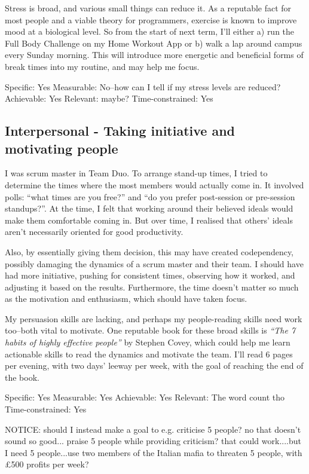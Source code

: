 \documentclass{scrartcl}
\begin{document}
Stress is broad, and various small things can reduce it. As a reputable fact for most people and a viable theory for programmers, exercise is known to improve mood at a biological level. So from the start of next term, I'll either a) run the Full Body Challenge on my Home Workout App or b) walk a lap around campus every Sunday morning. This will introduce more energetic and beneficial forms of break times into my routine, and may help me focus.

Specific: Yes
Measurable: No--how can I tell if my stress levels are reduced?
Achievable: Yes
Relevant: maybe?
Time-constrained: Yes

\subsection{Interpersonal - Taking initiative and motivating people} %
I was scrum master in Team Duo. To arrange stand-up times, I tried to determine the times where the most members would actually come in. It involved polls: ``what times are you free?'' and ``do you prefer post-session or pre-session standups?''. At the time, I felt that working around their believed ideals would make them comfortable coming in. But over time, I realised that others' ideals aren't necessarily oriented for good productivity.

Also, by essentially giving them decision, this may have created codependency, possibly damaging the dynamics of a scrum master and their team. I should have had more initiative, pushing for consistent times, observing how it worked, and adjusting it based on the results. Furthermore, the time doesn't matter so much as the motivation and enthusiasm, which should have taken focus.

My persuasion skills are lacking, and perhaps my people-reading skills need work too--both vital to motivate. One reputable book for these broad skills is \textit{``The 7 habits of highly effective people''} by Stephen Covey, which could help me learn actionable skills to read the dynamics and motivate the team. I'll read 6 pages per evening, with two days' leeway per week, with the goal of reaching the end of the book.

Specific: Yes
Measurable: Yes
Achievable: Yes
Relevant: The word count tho
Time-constrained: Yes

NOTICE: should I instead make a goal to e.g. criticise 5 people? no that doesn't sound so good... praise 5 people while providing criticism? that could work....but I need 5 people...use two members of the Italian mafia to threaten 5 people, with £500 profits per week?
\end{document}

